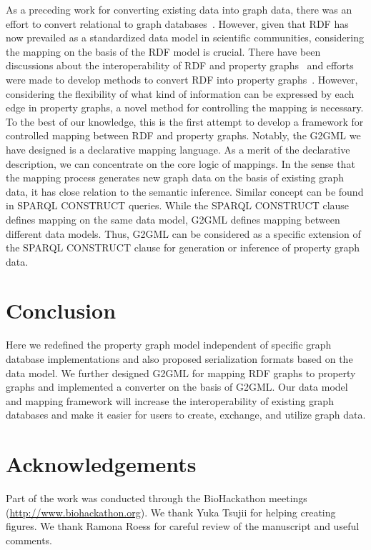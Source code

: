 \documentclass[runningheads]{llncs}
\begin{document}
As a preceding work for converting existing data into graph data, there was an effort to convert relational to graph databases~\cite{virgilio1}. 
However, given that RDF has now prevailed as a standardized data model in scientific communities, considering the mapping on the basis of the RDF model is crucial. There have been discussions about the interoperability of RDF and property graphs~\cite{hartig,angles4,das,thakkar} and efforts were made to develop methods to convert RDF into property graphs~\cite{tomaszuk1,virgilio}. However, considering the flexibility of what kind of information can be expressed by each edge in property graphs, a novel method for controlling the mapping is necessary.
To the best of our knowledge, this is the first attempt to develop a framework for controlled mapping between RDF and property graphs. 
Notably, the G2GML we have designed is a declarative mapping language. 
As a merit of the declarative description, we can concentrate on the core logic of mappings. In the sense that the mapping process generates new graph data on the basis of existing graph data, it has close relation to the semantic inference. Similar concept can be found in SPARQL CONSTRUCT queries. While the SPARQL CONSTRUCT clause defines mapping on the same data model, G2GML defines mapping between different data models. 
Thus, G2GML can be considered as a specific extension of the SPARQL CONSTRUCT clause for generation or inference of property graph data.

\section{Conclusion}
Here we redefined the property graph model independent of specific graph database implementations and also proposed serialization formats based on the data model.
We further designed G2GML for mapping RDF graphs to property graphs and implemented a converter on the basis of G2GML.
Our data model and mapping framework will increase the interoperability of existing graph databases and make it easier for users to create, exchange, and utilize graph data.

\section*{Acknowledgements}
Part of the work was conducted through the BioHackathon meetings (\url{http://www.biohackathon.org}). We thank Yuka Tsujii for helping creating figures. We thank Ramona Roess for careful review of the manuscript and useful comments.
\end{document}
